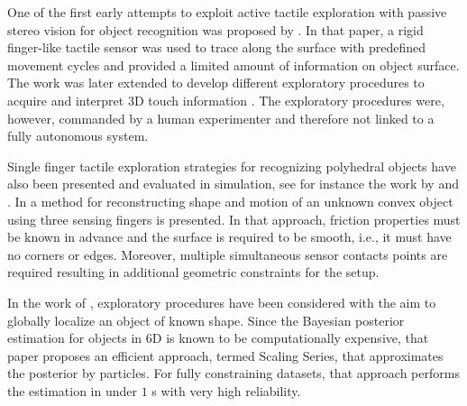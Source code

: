
One of the first early attempts to exploit active tactile exploration with passive stereo vision for object recognition was proposed by \citet{Allen1987Robotic}. In that paper, a rigid finger-like tactile sensor was used to trace along the surface with predefined movement cycles and provided a limited amount of information on object surface. The work was later extended to develop different exploratory procedures to acquire and interpret 3D touch information \citet{Allen1990Acquisition}. The exploratory procedures were, however, commanded by a human experimenter and therefore not linked to a fully autonomous system.
 
Single finger tactile exploration strategies for recognizing polyhedral objects have also been presented and evaluated in simulation, see for instance the work by \citet{Roberts1990ICRA} and \citet{Caselli1996ICRA}. In \citet{Moll2003STAR} a method for reconstructing shape and motion of an unknown convex object using three sensing fingers is presented. In that approach, friction properties must be known in advance and the surface is required to be smooth, i.e., it must have no corners or edges. Moreover, multiple simultaneous sensor contacts points are required resulting in additional geometric constraints for the setup.
 

In the work of \citet{Petrovskaya2011Global}, exploratory procedures have been considered with the aim to globally localize an object of known shape. Since the Bayesian posterior estimation for objects in 6D is known to be computationally expensive, that paper proposes an efficient approach, termed Scaling Series, that approximates the posterior by particles. For fully constraining datasets, that approach performs the estimation in under $1$ s with very high reliability.

